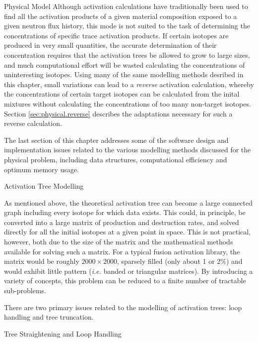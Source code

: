 \begin{chapter}{Physical Model\label{chap:physical}}
Although activation calculations have traditionally been used to find
all the activation products of a given material composition exposed to
a given neutron flux history, this mode is not suited to the task of
determining the concentrations of specific trace activation products.
If certain isotopes are produced in very small quantities, the
accurate determination of their concentration requires that the
activation trees be allowed to grow to large sizes, and much
computational effort will be wasted calculating the concentrations of
uninteresting isotopes.  Using many of the same modelling methods
desribed in this chapter, small variations can lead to a
\textsl{reverse} activation calculation, whereby the concentrations of
certain target isotopes can be calculated from the inital mixtures
without calculating the concentrations of too many non-target
isotopes.  Section \ref{sec:physical.reverse} describes the
adaptations necessary for such a reverse calculation.

The last section of this chapter addresses some of the software design
and implementation issues related to the various modelling methods
discussed for the physical problem, including data structures,
computational efficiency and optimum memory usage.

\begin{section}{Activation Tree Modelling\label{sec:physical.chains}}
  
  As mentioned above, the theoretical activation tree can become a
  large connected graph including every isotope for which data exists.
  This could, in principle, be converted into a large matrix of
  production and destruction rates, and solved directly for all the
  initial isotopes at a given point in space.  This is not practical,
  however, both due to the size of the matrix and the mathematical
  methods available for solving such a matrix.  For a typical fusion
  activation library, the matrix would be roughly $2000 \times 2000$,
  sparsely filled (only about 1 or 2\%) and would exhibit little
  pattern (\textsl{i.e.} banded or triangular matrices).  By
  introducing a variety of concepts, this problem can be reduced to a
  finite number of tractable sub-problems.  
  
  There are two primary issues related to the modelling of activation
  trees: loop handling and tree truncation.
  
  \begin{subsection}{Tree Straightening and Loop Handling}
    

\end{subsection}
\end{section}
\end{chapter}

